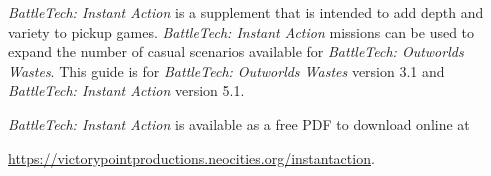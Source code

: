 \emph{BattleTech: Instant Action} is a supplement that is intended to add depth and variety to pickup games.
\emph{BattleTech: Instant Action} missions can be used to expand the number of casual scenarios available for \emph{BattleTech: Outworlds Wastes}.
This guide is for \emph{BattleTech: Outworlds Wastes} version 3.1 and \emph{BattleTech: Instant Action} version 5.1.

\emph{BattleTech: Instant Action} is available as a free PDF to download online at

 \href{https://victorypointproductions.neocities.org/instantaction}{https://victorypointproductions.neocities.org/instantaction}.
